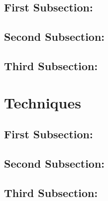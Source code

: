 \documentclass{article}
\begin{document}
\subsection*{First Subsection:}
\setcounter{equation}{0}



\subsection*{Second Subsection:}
\setcounter{equation}{0}



\subsection*{Third Subsection:}
\setcounter{equation}{0}




\section*{Techniques}

\subsection*{First Subsection:}
\setcounter{equation}{0}



\subsection*{Second Subsection:}
\setcounter{equation}{0}



\subsection*{Third Subsection:}
\setcounter{equation}{0}
\end{document}

